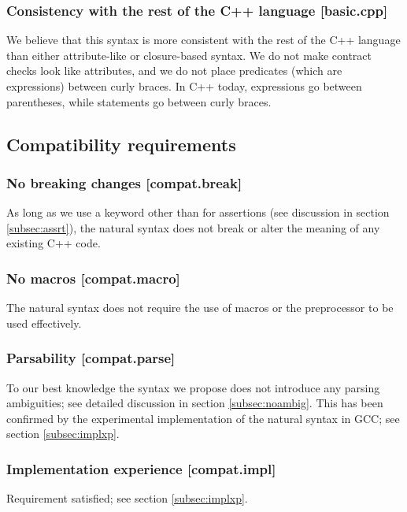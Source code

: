 \subsubsection{Consistency with the rest of the C++ language  [basic.cpp]}

We believe that this syntax is more consistent with the rest of the C++ language than either attribute-like or closure-based syntax. We do not make contract checks look like attributes, and we do not place predicates (which are expressions) between curly braces. In C++ today, expressions go between parentheses, while statements go between curly braces.

\subsection{Compatibility requirements}

\subsubsection{No breaking changes  [compat.break]}

As long as we use a keyword other than  for assertions (see discussion in section \ref{subsec:assrt}), the natural syntax does not break or alter the meaning of any existing C++ code.

\subsubsection{No macros  [compat.macro]}

The natural syntax does not require the use of macros or the preprocessor to be used effectively.

\subsubsection{Parsability  [compat.parse]}

To our best knowledge the syntax we propose does not introduce any parsing ambiguities; see detailed discussion in section \ref{subsec:noambig}. This has been confirmed by the experimental implementation of the natural syntax in GCC; see section \ref{subsec:implxp}.

\subsubsection{Implementation experience  [compat.impl]}

Requirement satisfied; see section \ref{subsec:implxp}.

